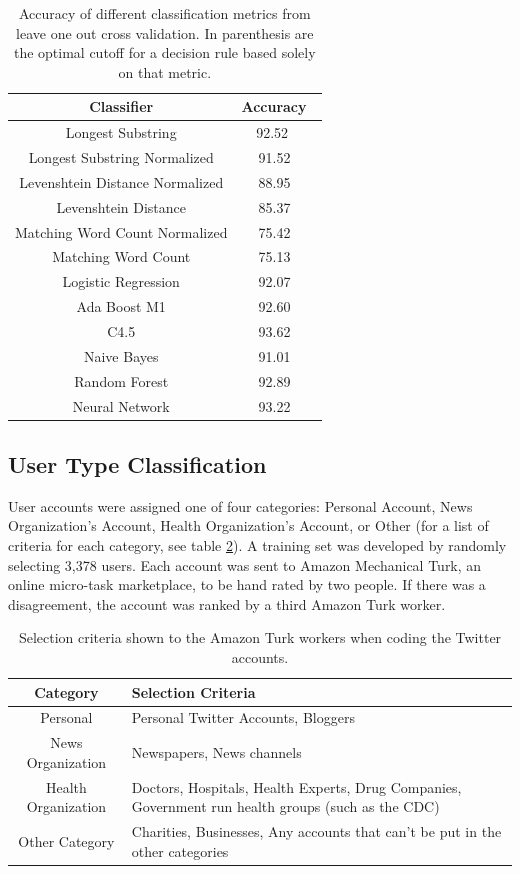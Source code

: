 \begin{table}
\centering
\begin{tabular}{|c|c|} \hline
Classifier & Accuracy\ \\ \hline 
Longest Substring & 92.52 \ \\ \hline
Longest Substring Normalized & 91.52\ \\ \hline
Levenshtein Distance Normalized & 88.95\ \\ \hline
Levenshtein Distance & 85.37\ \\ \hline
Matching Word Count Normalized & 75.42\ \\ \hline
Matching Word Count & 75.13\ \\ \hline
Logistic Regression & 92.07\ \\ \hline
Ada Boost M1 & 92.60\ \\ \hline
C4.5 & 93.62\ \\ \hline
Naive Bayes & 91.01\ \\ \hline
Random Forest & 92.89\ \\ \hline
Neural Network & 93.22\ \\ \hline
\end{tabular}
\caption{Accuracy of different classification metrics from leave one out cross validation. In parenthesis are the optimal cutoff for a decision rule based solely on that metric.}
\label{table:related_classifier}
\end{table}


\subsection{User Type Classification}
User accounts were assigned one of four categories: Personal Account, News Organization's Account, Health Organization's Account, or Other (for a list of criteria for each category, see table \ref{table:user_category}). A training set was developed by randomly selecting 3,378 users. Each account was sent to Amazon Mechanical Turk, an online micro-task marketplace, to be hand rated by two people. If there was a disagreement, the account was ranked by a third Amazon Turk worker. 

\begin{table}
\centering
\begin{tabular}{|c| p{5cm}|} \hline
Category & Selection Criteria \ \\ \hline
Personal & Personal Twitter Accounts, Bloggers \ \\ \hline
News Organization & Newspapers, News channels \ \\ \hline
Health Organization & Doctors, Hospitals, Health Experts, Drug Companies, Government run health groups (such as the CDC) \ \\ \hline
Other Category & Charities, Businesses, Any accounts that can't be put in the other categories \ \\ \hline
\end{tabular}
\caption{Selection criteria shown to the Amazon Turk workers when coding the Twitter accounts.}
\label{table:user_category}
\end{table}

